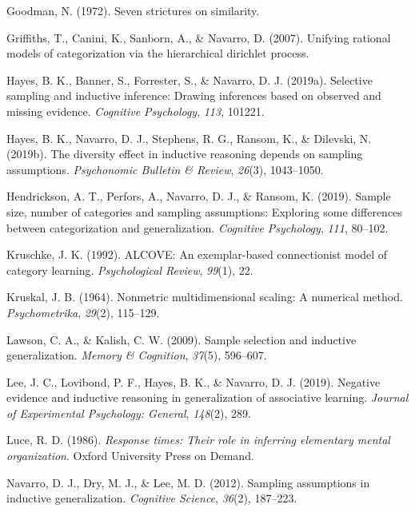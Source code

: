 \documentclass[english,doc]{apa6}
\begin{document}
\leavevmode\hypertarget{ref-goodman1972seven}{}%
Goodman, N. (1972). Seven strictures on similarity.

\leavevmode\hypertarget{ref-griffiths2007unifying}{}%
Griffiths, T., Canini, K., Sanborn, A., \& Navarro, D. (2007). Unifying rational models of categorization via the hierarchical dirichlet process.

\leavevmode\hypertarget{ref-hayes2019selective}{}%
Hayes, B. K., Banner, S., Forrester, S., \& Navarro, D. J. (2019a). Selective sampling and inductive inference: Drawing inferences based on observed and missing evidence. \emph{Cognitive Psychology}, \emph{113}, 101221.

\leavevmode\hypertarget{ref-hayes2019diversity}{}%
Hayes, B. K., Navarro, D. J., Stephens, R. G., Ransom, K., \& Dilevski, N. (2019b). The diversity effect in inductive reasoning depends on sampling assumptions. \emph{Psychonomic Bulletin \& Review}, \emph{26}(3), 1043--1050.

\leavevmode\hypertarget{ref-hendrickson2019sample}{}%
Hendrickson, A. T., Perfors, A., Navarro, D. J., \& Ransom, K. (2019). Sample size, number of categories and sampling assumptions: Exploring some differences between categorization and generalization. \emph{Cognitive Psychology}, \emph{111}, 80--102.

\leavevmode\hypertarget{ref-kruschke1992alcove}{}%
Kruschke, J. K. (1992). ALCOVE: An exemplar-based connectionist model of category learning. \emph{Psychological Review}, \emph{99}(1), 22.

\leavevmode\hypertarget{ref-kruskal1964nonmetric}{}%
Kruskal, J. B. (1964). Nonmetric multidimensional scaling: A numerical method. \emph{Psychometrika}, \emph{29}(2), 115--129.

\leavevmode\hypertarget{ref-lawson2009sample}{}%
Lawson, C. A., \& Kalish, C. W. (2009). Sample selection and inductive generalization. \emph{Memory \& Cognition}, \emph{37}(5), 596--607.

\leavevmode\hypertarget{ref-lee2019negative}{}%
Lee, J. C., Lovibond, P. F., Hayes, B. K., \& Navarro, D. J. (2019). Negative evidence and inductive reasoning in generalization of associative learning. \emph{Journal of Experimental Psychology: General}, \emph{148}(2), 289.

\leavevmode\hypertarget{ref-luce1986response}{}%
Luce, R. D. (1986). \emph{Response times: Their role in inferring elementary mental organization}. Oxford University Press on Demand.

\leavevmode\hypertarget{ref-navarro2012sampling}{}%
Navarro, D. J., Dry, M. J., \& Lee, M. D. (2012). Sampling assumptions in inductive generalization. \emph{Cognitive Science}, \emph{36}(2), 187--223.
\end{document}
